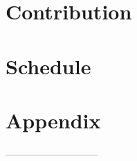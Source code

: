 \documentclass[12pt]{article}
\begin{document}
\section{Contribution}
\label{contribution}


\section{Schedule}
\label{schedule}


\clearpage
\newpage



\clearpage
\newpage

\section{Appendix}
\label{appendix}

 
  -----------------------------
\end{document}
